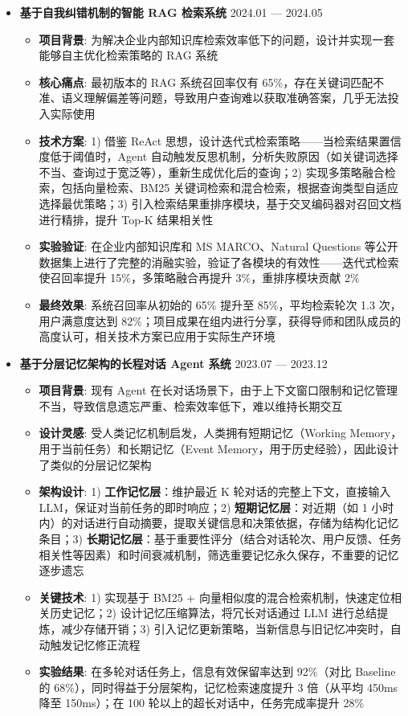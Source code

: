 \documentclass[zh]{resume}
\begin{document}
\begin{itemize}
    \item \textbf{基于自我纠错机制的智能 RAG 检索系统} \hfill 2024.01 --- 2024.05
    \begin{itemize}
        \item \textbf{项目背景}: 为解决企业内部知识库检索效率低下的问题，设计并实现一套能够自主优化检索策略的 RAG 系统
        \item \textbf{核心痛点}: 最初版本的 RAG 系统召回率仅有 65\%，存在关键词匹配不准、语义理解偏差等问题，导致用户查询难以获取准确答案，几乎无法投入实际使用
        \item \textbf{技术方案}: 1) 借鉴 ReAct 思想，设计迭代式检索策略——当检索结果置信度低于阈值时，Agent 自动触发反思机制，分析失败原因（如关键词选择不当、查询过于宽泛等），重新生成优化后的查询；2) 实现多策略融合检索，包括向量检索、BM25 关键词检索和混合检索，根据查询类型自适应选择最优策略；3) 引入检索结果重排序模块，基于交叉编码器对召回文档进行精排，提升 Top-K 结果相关性
        \item \textbf{实验验证}: 在企业内部知识库和 MS MARCO、Natural Questions 等公开数据集上进行了完整的消融实验，验证了各模块的有效性——迭代式检索使召回率提升 15\%，多策略融合再提升 3\%，重排序模块贡献 2\%
        \item \textbf{最终效果}: 系统召回率从初始的 65\% 提升至 85\%，平均检索轮次 1.3 次，用户满意度达到 82\%；项目成果在组内进行分享，获得导师和团队成员的高度认可，相关技术方案已应用于实际生产环境
    \end{itemize}

    \item \textbf{基于分层记忆架构的长程对话 Agent 系统} \hfill 2023.07 --- 2023.12
    \begin{itemize}
        \item \textbf{项目背景}: 现有 Agent 在长对话场景下，由于上下文窗口限制和记忆管理不当，导致信息遗忘严重、检索效率低下，难以维持长期交互
        \item \textbf{设计灵感}: 受人类记忆机制启发，人类拥有短期记忆（Working Memory，用于当前任务）和长期记忆（Event Memory，用于历史经验），因此设计了类似的分层记忆架构
        \item \textbf{架构设计}: 1) \textbf{工作记忆层}：维护最近 K 轮对话的完整上下文，直接输入 LLM，保证对当前任务的即时响应；2) \textbf{短期记忆层}：对近期（如 1 小时内）的对话进行自动摘要，提取关键信息和决策依据，存储为结构化记忆条目；3) \textbf{长期记忆层}：基于重要性评分（结合对话轮次、用户反馈、任务相关性等因素）和时间衰减机制，筛选重要记忆永久保存，不重要的记忆逐步遗忘
        \item \textbf{关键技术}: 1) 实现基于 BM25 + 向量相似度的混合检索机制，快速定位相关历史记忆；2) 设计记忆压缩算法，将冗长对话通过 LLM 进行总结提炼，减少存储开销；3) 引入记忆更新策略，当新信息与旧记忆冲突时，自动触发记忆修正流程
        \item \textbf{实验结果}: 在多轮对话任务上，信息有效保留率达到 92\%（对比 Baseline 的 68\%），同时得益于分层架构，记忆检索速度提升 3 倍（从平均 450ms 降至 150ms）；在 100 轮以上的超长对话中，任务完成率提升 28\%


\end{itemize}
\end{itemize}
\end{document}

